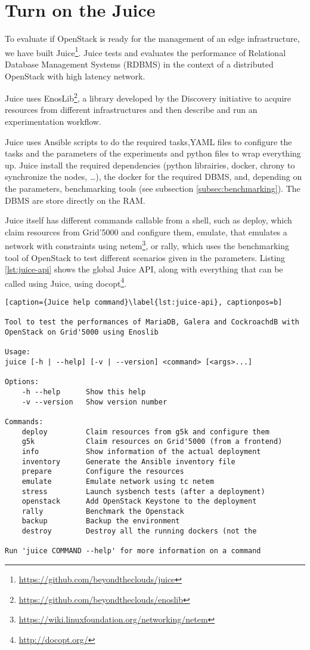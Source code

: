 \section{Turn on the Juice}


To evaluate if OpenStack is ready for the management of an edge infrastructure, we have built Juice\footnote{\url{https://github.com/beyondtheclouds/juice}}. Juice tests and evaluates the performance of Relational Database Management Systems (RDBMS) in the context of a distributed OpenStack with high latency network.

Juice uses EnosLib\footnote{\url{https://github.com/beyondtheclouds/enoslib}}, a library developed by the Discovery initiative to acquire resources from different infrastructures and then describe and run an experimentation workflow.

Juice uses Ansible scripts to do the required tasks,YAML files to configure the tasks and the parameters of the experiments and python files to wrap everything up. Juice install the required dependencies (python librairies, docker, chrony to synchronize the nodes, \dots), the docker for the required DBMS, and, depending on the parameters, benchmarking tools (see subsection \ref{subsec:benchmarking}). The DBMS are store directly on the RAM.

Juice itself has different commands callable from a shell, such as deploy, which claim resources from Grid'5000 and configure them, emulate, that emulates a network with constraints using netem\footnote{\url{https://wiki.linuxfoundation.org/networking/netem}}, or rally, which uses the benchmarking tool of OpenStack to test different scenarios given in the parameters. Listing \ref{lst:juice-api} shows the global Juice API, along with everything that can be called using Juice, using docopt\footnote{\url{http://docopt.org/}}.

\begin{lstlisting}[caption={Juice help command}\label{lst:juice-api}, captionpos=b]

Tool to test the performances of MariaDB, Galera and CockroachdB with
OpenStack on Grid'5000 using Enoslib

Usage:
juice [-h | --help] [-v | --version] <command> [<args>...]

Options:
    -h --help      Show this help
    -v --version   Show version number

Commands:
    deploy         Claim resources from g5k and configure them
    g5k            Claim resources on Grid'5000 (from a frontend)
    info           Show information of the actual deployment
    inventory      Generate the Ansible inventory file
    prepare        Configure the resources
    emulate        Emulate network using tc netem
    stress         Launch sysbench tests (after a deployment)
    openstack      Add OpenStack Keystone to the deployment
    rally          Benchmark the Openstack
    backup         Backup the environment
    destroy        Destroy all the running dockers (not the

Run 'juice COMMAND --help' for more information on a command
\end{lstlisting}

